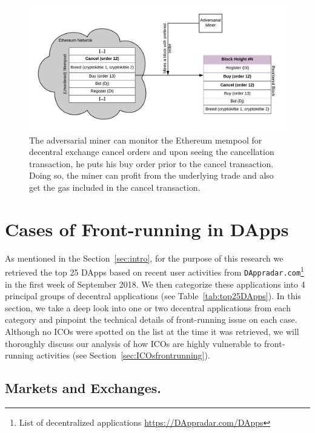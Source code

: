 \begin{figure}[h]
\centering
\includegraphics[width=0.7\linewidth]{figures/Miner_reorder_frontrun.png}
\caption{The adversarial miner can monitor the Ethereum mempool for decentral exchange cancel orders and upon seeing the cancellation transaction, he puts his buy order prior to the cancel transaction. Doing so, the miner can profit from the underlying trade and also get the gas included in the cancel transaction. \label{fig:MinerFrontrunning}} 
\end{figure}



\section{Cases of Front-running in DApps}  

As mentioned in the Section~\ref{sec:intro}, for the purpose of this research we retrieved the top 25 DApps based on recent user activities from \texttt{DAppradar.com}\footnote{List of decentralized applications \url{https://DAppradar.com/DApps}} in the first week of September 2018. We then categorize these applications into 4 principal groups of decentral applications (see Table~\ref{tab:top25DApps}). In this section, we take a deep look into one or two decentral applications from each category and pinpoint the technical details of front-running issue on each case. Although no ICOs were spotted on the list at the time it was retrieved, we will thoroughly discuss our analysis of how ICOs are highly vulnerable to front-running activities (see Section~\ref{sec:ICOsfrontrunning}).



\subsection{Markets and Exchanges.} \label{sec:frontrunningExchanges}


